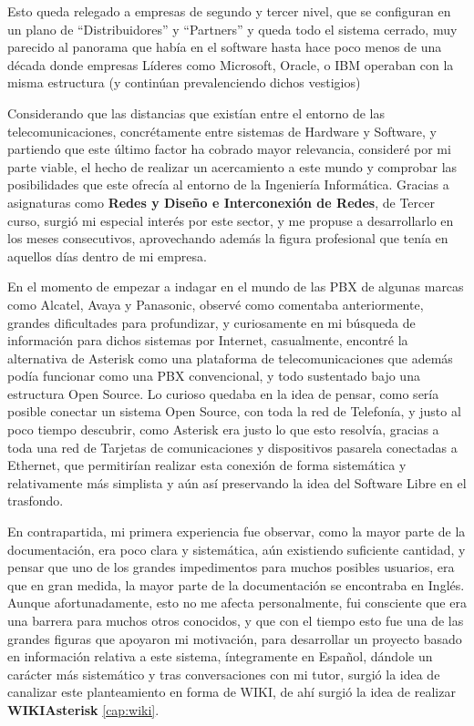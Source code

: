 Esto queda relegado a empresas de segundo y tercer nivel, que se configuran en un plano de ``Distribuidores'' y ``Partners'' y queda todo el sistema cerrado, muy parecido al panorama que había en el software hasta hace poco menos de una década donde empresas Líderes como Microsoft, Oracle, o IBM operaban con la misma estructura (y continúan prevalenciendo dichos vestigios)

Considerando que las distancias que existían entre el entorno de las telecomunicaciones, concrétamente entre sistemas de Hardware y Software, y partiendo que este último factor ha cobrado mayor relevancia, consideré por mi parte viable, el hecho de realizar un acercamiento a este mundo y comprobar las posibilidades que este ofrecía al entorno de la Ingeniería Informática. Gracias a asignaturas como \textbf{Redes y Diseño e Interconexión de Redes}, de Tercer curso, surgió mi especial interés por este sector, y me propuse a desarrollarlo en los meses consecutivos, aprovechando además la figura profesional que tenía en aquellos días dentro de mi empresa.

En el momento de empezar a indagar en el mundo de las PBX de algunas marcas como Alcatel, Avaya y Panasonic, observé como comentaba anteriormente, grandes dificultades para profundizar, y curiosamente en mi búsqueda de información para dichos sistemas por Internet, casualmente, encontré la alternativa de Asterisk como una plataforma de telecomunicaciones que además podía funcionar como una PBX convencional, y todo sustentado bajo una estructura Open Source. Lo curioso quedaba en la idea de pensar, como sería posible conectar un sistema Open Source, con toda la red de Telefonía, y justo al poco tiempo descubrir, como Asterisk era justo lo que esto resolvía, gracias a toda una red de Tarjetas de comunicaciones y dispositivos pasarela conectadas a Ethernet, que permitirían realizar esta conexión de forma sistemática y relativamente más simplista y aún así preservando la idea del Software Libre en el trasfondo.

En contrapartida, mi primera experiencia fue observar, como la mayor parte de la documentación, era poco clara y sistemática, aún existiendo suficiente cantidad, y pensar que uno de los grandes impedimentos para muchos posibles usuarios, era que en gran medida, la mayor parte de la documentación se encontraba en Inglés. Aunque afortunadamente, esto no me afecta personalmente, fui consciente que era una barrera para muchos otros conocidos, y que con el tiempo esto fue una de las grandes figuras que apoyaron mi motivación, para desarrollar un proyecto basado en información relativa a este sistema, íntegramente en Español, dándole un carácter más sistemático y tras conversaciones con mi tutor, surgió la idea de canalizar este planteamiento en forma de WIKI, de ahí surgió la idea de realizar \textbf{WIKIAsterisk} \ref{cap:wiki}.

